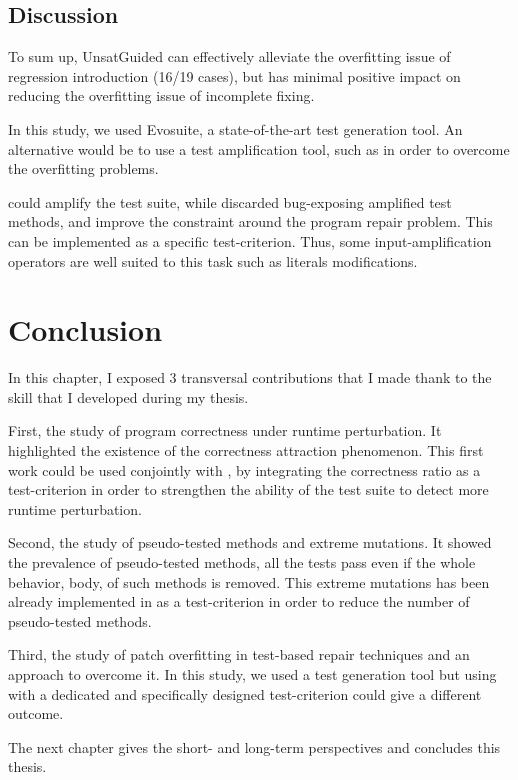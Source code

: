 \subsection{Discussion}
\label{subsec:transversal-contributions:test-for-repair:conclusion}

To sum up, UnsatGuided can effectively alleviate the overfitting issue of regression introduction (16/19 cases), but has minimal positive impact on reducing the overfitting issue of incomplete fixing.

In this study, we used Evosuite, a state-of-the-art test generation tool.
An alternative would be to use a test amplification tool, such as \dspot in order to overcome the overfitting problems.

\dspot could amplify the test suite, while discarded bug-exposing amplified test methods, and improve the constraint around the program repair problem.
This can be implemented as a specific test-criterion.
Thus, some input-amplification operators are well suited to this task such as literals modifications.

\section{Conclusion}
\label{sec:transversal-contributions:conclusion}

In this chapter, I exposed 3 transversal contributions that I made thank to the skill that I developed during my thesis.

First, the study of program correctness under runtime perturbation.
It highlighted the existence of the correctness attraction phenomenon.
This first work could be used conjointly with \dspot, by integrating the correctness ratio as a test-criterion in order to strengthen the ability of the test suite to detect more runtime perturbation.

Second, the study of pseudo-tested methods and extreme mutations.
It showed the prevalence of pseudo-tested methods, all the tests pass even if the whole behavior, \ie body, of such methods is removed.
This extreme mutations has been already implemented in \dspot as a test-criterion in order to reduce the number of pseudo-tested methods.

Third, the study of patch overfitting in test-based repair techniques and an approach to overcome it.
In this study, we used a test generation tool but using \dspot with a dedicated and specifically designed test-criterion could give a different outcome.

The next chapter gives the short- and long-term perspectives and concludes this thesis.